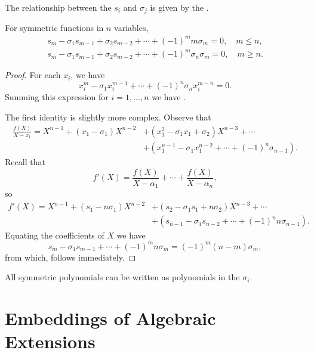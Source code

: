 The relationship between the $s_i$ and $\sigma_j$ is given by the
.
\begin{proposition} \label{Newton:Ident:Prop}
For symmetric functions in $n$ variables,
\begin{align}
s_m - \sigma_1 s_{m-1} + \sigma_2 s_{m-2} + \cdots + (-1)^m m \sigma_m
  = 0, \quad m \le n, \label{Newton:Ident:Eqa}\\
s_m - \sigma_1 s_{m-1} + \sigma_2 s_{m-2} + \cdots + (-1)^m
    \sigma_{n} \sigma_m 
  = 0, \quad m \ge n. \label{Newton:Ident:Eqb}
\end{align}


\end{proposition}

\begin{proof}
For each $x_i$, we have
\[
x_i^m - \sigma_1 x_i^{m-1} + \cdots + (-1)^n \sigma_n x_i^{m -n} = 0.
\]
Summing this expression for $i = 1, \ldots, n$ we have
.

The first identity is slightly more complex.  Observe that
\[
\begin{aligned}
\frac{f(X)}{X-x_1} = X^{n-1} + (x_1 - \sigma_1)X^{n-2} 
  &+ (x_1^2 - \sigma_1 x_1 + \sigma_2) X^{n-3} + \cdots  \\
  &+ (x_1^{n-1} - \sigma_1 x_1^{n-2} + \cdots + (-1)^n\sigma_{n-1}).
\end{aligned}
\]
Recall that
\[
f'(X) = \frac{f(X)}{X - \alpha_1} + \cdots + \frac{f(X)}{X - \alpha_n},
\]
so
\[
\begin{aligned}
f'(X) = X^{n-1} + (s_1 - n \sigma_1)X^{n-2} 
  &+ (s_2 - \sigma_1 s_1 + n \sigma_2) X^{n-3} + \cdots  \\
  &+ (s_{n-1} - \sigma_1 s_{n-2} + \cdots + (-1)^n n \sigma_{n-1}).
\end{aligned}
\]
Equating the coefficients of $X$ we have
\[
s_m - \sigma_1 s_{m-1} + \cdots + (-1)^m n \sigma_m 
  = (-1)^m (n - m) \sigma_m,
\]
from which,  follows immediately.
\end{proof}

\begin{proposition}
All symmetric polynomials can be written as polynomials in the
$\sigma_i$.
\end{proposition}


\section{Embeddings of Algebraic Extensions}
\label{Norm:Trace:Sec}

